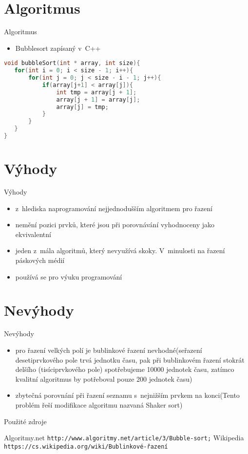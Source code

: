 \documentclass[10pt ]{beamer}
\begin{document}
\section{Algoritmus}
\begin{frame}[fragile]{Algoritmus}
\begin{itemize}
\item Bubblesort zapísaný v~C++
\end{itemize}
\begin{lstlisting}[language=C++]
void bubbleSort(int * array, int size){
   for(int i = 0; i < size - 1; i++){
       for(int j = 0; j < size - i - 1; j++){
           if(array[j+1] < array[j]){
               int tmp = array[j + 1];
               array[j + 1] = array[j];
               array[j] = tmp;
           }   
       }   
   }   
}  
\end{lstlisting}
\end{frame}

\section{Výhody}
\begin{frame}{Výhody}
\begin{itemize}
\item z~hlediska naprogramování nejjednodušším algoritmem pro řazení
\item nemění pozici prvků, které jsou při porovnávání vyhodnoceny jako ekvivalentní
\item jeden z~mála algoritmů, který nevyužívá skoky. V~minulosti na řazení páskových médií
\item používá se pro výuku programování
\end{itemize}
\end{frame}

\section{Nevýhody}
\begin{frame}{Nevýhody}
\begin{itemize}
\item pro řazení velkých polí je bublinkové řazení nevhodné(seřazení desetiprvkového pole trvá jednotku času, pak při bublinkovém řazení stokrát delšího (tisíciprvkového pole) spotřebujeme 10000 jednotek času, zatímco kvalitní algoritmus by potřeboval pouze 200 jednotek času)
\item zbytečná porovnání při řazení seznamu s~nejnižším prvkem na konci(Tento problém řeší modifikace algoritmu nazvaná Shaker sort)
\end{itemize}
\end{frame}

\begin{frame}{Použité zdroje}
	\begin{thebibliography}{10}
		 Algoritmy.net
		\newblock \texttt{http://www.algoritmy.net/article/3/Bubble-sort;}
		 Wikipedia
		\newblock \texttt{https://cs.wikipedia.org/wiki/Bublinkové-řazení}
	\end{thebibliography}
\end{frame}
\end{document}
